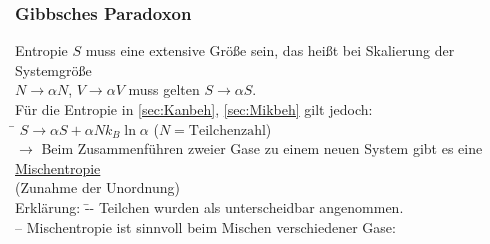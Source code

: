\subsubsection{Gibbsches Paradoxon}
\begin{tabbing}
Entropie $S$ muss eine extensive Größe sein, das heißt bei Skalierung der Systemgröße\\
$N \to\alpha N$, $V\to \alpha V$ muss gelten $S\to\alpha S$.\\
Für die Entropie in \ref{sec:Kanbeh}, \ref{sec:Mikbeh} gilt jedoch:\\
\hspace{4em} \= \kill
\> $S \to \alpha S + \alpha N k_B \ln \alpha$ ($N = \text{Teilchenzahl}$)\\
$\rightarrow$\> Beim Zusammenführen zweier Gase zu einem neuen System gibt es eine \uline{Mischentropie}\\\> (\glqq Zunahme der Unordnung\grqq )\\
Erklärung: \= -- Teilchen wurden als unterscheidbar angenommen.\\
\> -- Mischentropie ist sinnvoll beim Mischen verschiedener Gase:
\end{tabbing}
\begin{figure}[H]
  \centering
\end{figure}
